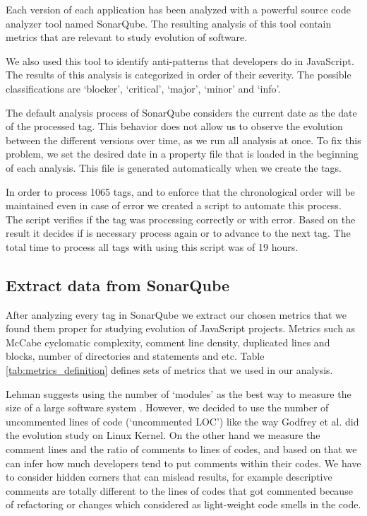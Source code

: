 \par
Each version of each application has been analyzed with a powerful source code analyzer tool named SonarQube. The resulting analysis of this tool contain metrics that are relevant to study evolution of software. 
\par
We also used this tool to identify anti-patterns that developers do in JavaScript. The results of this analysis is categorized in order of their severity. The possible classifications are `blocker', `critical', `major', `minor' and `info'.
\par
The default analysis process of SonarQube considers the current date as the date of the processed tag. This behavior does not allow us to observe the evolution between the different versions over time, as we run all analysis at once. To fix this problem, we set the desired date in a property file that is loaded in the beginning of each analysis. This file is generated automatically when we create the tags. 

In order to process 1065 tags, and to enforce that the chronological order will be maintained even in case of error we created a script to automate this process.
The script verifies if the tag was processing correctly or with error. Based on the result it decides if is necessary process again or to advance to the next tag. The total time to  process all tags with using this script was of 19 hours.

\subsection{Extract data from SonarQube}

\par After analyzing every tag in SonarQube we extract our chosen metrics that we found them proper for studying evolution of JavaScript projects. Metrics such as McCabe cyclomatic complexity,  comment line density, duplicated lines and blocks, number of directories and statements and etc. Table  \ref{tab:metrics_definition} defines sets of metrics that we used in our analysis.

\par
Lehman suggests using the number of `modules' as the best way to measure the size of a large software system \cite{Lehman1997METRICS}. However, we decided to use the number of uncommented lines of code (`uncommented LOC') like the way Godfrey et al. \cite{Godfrey2000ICMS} did the evolution study on Linux Kernel. On the other hand we measure the comment lines and the ratio of comments to lines of codes, and based on that we can infer how much developers tend to put comments within their codes. We have to consider hidden corners that can mislead results, for example descriptive comments are totally different to the lines of codes that got commented because of refactoring or changes which considered as light-weight code smells in the code.

